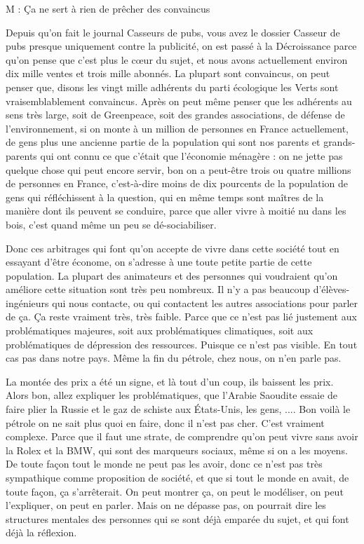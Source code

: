 \begin{description}
\vspace{1\baselineskip}

M : Ça ne sert à rien de prêcher des convaincus

\vspace{1\baselineskip}

Depuis qu'on fait le journal Casseurs de pubs, vous avez le dossier Casseur de pubs presque uniquement contre la publicité, on est passé à la Décroissance parce qu'on pense que c'est plus le cœur du sujet, et nous avons actuellement environ dix mille ventes et trois mille abonnés. La plupart sont convaincus, on peut penser que, disons les vingt mille adhérents du parti écologique les Verts sont vraisemblablement convaincus. Après on peut même penser que les adhérents au sens très large, soit de Greenpeace, soit des grandes associations, de défense de l'environnement, si on monte à un million de personnes en France actuellement, de gens plus une ancienne partie de la population qui sont nos parents et grands-parents qui ont connu ce que c'était que l'économie ménagère : on ne jette pas quelque chose qui peut encore servir, bon on a peut-être trois ou quatre millions de personnes en France, c'est-à-dire moins de dix pourcents de la population de gens qui réfléchissent à la question, qui en même temps sont maîtres de la manière dont ils peuvent se conduire, parce que aller vivre à moitié nu dans les bois, c'est quand même un peu se dé-sociabiliser. 

Donc ces arbitrages qui font qu'on accepte de vivre dans cette société tout en essayant d'être économe, on s'adresse à une toute petite partie de cette population. La plupart des animateurs et des personnes qui voudraient qu'on améliore cette situation sont très peu nombreux. Il n'y a pas beaucoup d'élèves-ingénieurs qui nous contacte, ou qui contactent les autres associations pour parler de ça. Ça reste vraiment très, très faible. Parce que ce n'est pas lié justement aux problématiques majeures, soit aux problématiques climatiques, soit aux problématiques de dépression des ressources. Puisque ce n'est pas visible. En tout cas pas dans notre pays. Même la fin du pétrole, chez nous, on n'en parle pas.

La montée des prix a été un signe, et là tout d'un coup, ils baissent les prix. Alors bon, allez expliquer les problématiques, que l'Arabie Saoudite essaie de faire plier la Russie et le gaz de schiste aux États-Unis, les gens, .... Bon voilà le pétrole on ne sait plus quoi en faire, donc il n'est pas cher. C'est vraiment complexe. Parce que il faut une strate, de comprendre qu'on peut vivre sans  avoir la Rolex et la BMW, qui sont des marqueurs sociaux, même si on a les moyens. De toute façon tout le monde ne peut pas les avoir, donc ce n'est pas très sympathique comme proposition de société, et que si tout le monde en avait, de toute façon, ça s'arrêterait. On peut montrer ça, on peut le modéliser, on peut l'expliquer, on peut en parler. Mais on ne dépasse pas, on pourrait dire les structures mentales des personnes qui se sont déjà emparée du sujet, et qui font déjà la réflexion.


\end{description}
